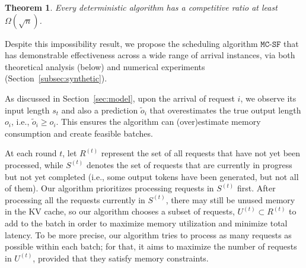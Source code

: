 \documentclass[11pt, a4paper]{article}
\theoremstyle{plain}
\newtheorem{theorem}{Theorem}[section]
\theoremstyle{definition}
\theoremstyle{remark}
\newcommand{\mcsdf}{\texttt{MC-SF}}
\newcommand{\alg}{\mcsdf}
\newcommand{\po}{\tilde{o}}
\newcommand{\xhdr}[1]{\vspace{1mm} \noindent{\bf #1}}
\begin{document}
\begin{theorem}
\label{thm:advr}
    Every deterministic algorithm has a competitive ratio at least $\Omega(\sqrt{n})$. 
\end{theorem}

Despite this impossibility result, we propose the scheduling algorithm $\alg$ that has demonstrable effectiveness across a wide range of arrival instances, via both theoretical analysis (below) and numerical experiments (Section~\ref{subsec:synthetic}).

\xhdr{Algorithm $\alg$.} As discussed in Section~\ref{sec:model}, upon the arrival of request $i$, we observe its input length $s_t$ and also a prediction $\po_i$ that overestimates the true output length $o_i$, i.e., $\po_i \ge o_i$. This ensures the algorithm can (over)estimate memory consumption and create feasible batches. 

At each round \( t \), let \( R^{(t)} \) represent the set of all requests that have not yet been processed, while \( S^{(t)} \) denotes the set of requests that are currently in progress but not yet completed (i.e., some output tokens have been generated, but not all of them). Our algorithm prioritizes processing requests in \( S^{(t)} \) first. After processing all the requests currently in $S^{(t)}$, there may still be unused memory in the KV cache, so our algorithm chooses a subset of requests, \( U^{(t)} \subset R^{(t)} \) to add to the batch in order to maximize memory utilization and minimize total latency. To be more precise, our algorithm tries to process as many requests as possible within each batch; for that, it aims to maximize the number of requests in \( U^{(t)} \), provided that they satisfy memory constraints. 
\end{document}

